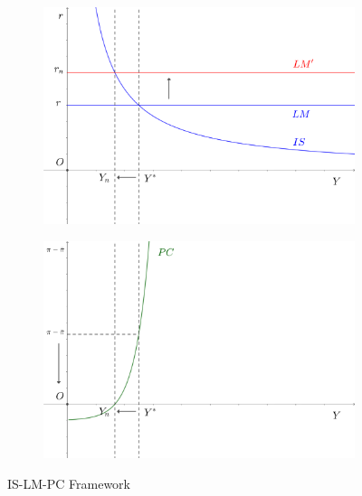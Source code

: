 \documentclass[12pt]{article}
\begin{document}
  \begin{figure}[htbp]
    \centering
    \begin{subfigure}[t]{0.7\textwidth}
      \centering
      \includegraphics[width=\linewidth]{islmpc01.png}
    \end{subfigure}\hfill
    \begin{subfigure}[t]{0.7\textwidth}
      \centering
      \includegraphics[width=\linewidth]{islmpc02.png}
    \end{subfigure}
    \caption{IS-LM-PC Framework}
    \label{fig:is-lm-pc}
  \end{figure}
\end{document}
